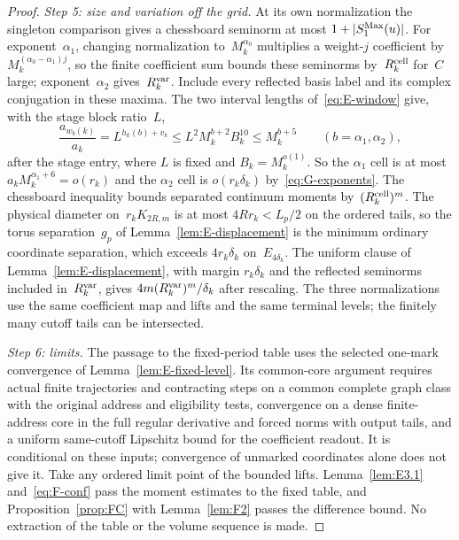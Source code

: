 \begin{proof}
\emph{Step 5: size and variation off the grid.} At its own normalization the singleton comparison gives a chessboard seminorm at most $1+|S_1^{\rm Max}(u)|$. For exponent~$\alpha_1$, changing normalization to~$M_k^{\alpha_0}$ multiplies a weight-$j$ coefficient by $M_k^{(\alpha_0-\alpha_1)j}$, so the finite coefficient sum bounds these seminorms by~$R^{\rm cell}_k$ for~$C$ large; exponent~$\alpha_2$ gives~$R^{\rm var}_k$. Include every reflected basis label and its complex conjugation in these maxima. The two interval lengths of~\eqref{eq:E-window} give, with the stage block ratio~$L$,
\begin{equation}\label{eq:G-root-sides}
\frac{a_{w_b(k)}}{a_k}=L^{h_k(b)+v_k}
\le L^2M_k^{b+2}B_k^{10}\le M_k^{b+5}
\qquad(b=\alpha_1,\alpha_2),
\end{equation}
after the stage entry, where $L$ is fixed and $B_k=M_k^{o(1)}$. So the $\alpha_1$ cell is at most $a_kM_k^{\alpha_1+6}=o(r_k)$ and the $\alpha_2$ cell is $o(r_k\delta_k)$ by~\eqref{eq:G-exponents}. The chessboard inequality bounds separated continuum moments by~$(R^{\rm cell}_k)^m$. The physical diameter on~$r_kK_{2R,m}$ is at most $4Rr_k<L_p/2$ on the ordered tails, so the torus separation~$g_p$ of Lemma~\ref{lem:E-displacement} is the minimum ordinary coordinate separation, which exceeds $4r_k\delta_k$ on~$E_{4\delta_k}$. The uniform clause of Lemma~\ref{lem:E-displacement}, with margin $r_k\delta_k$ and the reflected seminorms included in~$R^{\rm var}_k$, gives $4m(R^{\rm var}_k)^m/\delta_k$ after rescaling. The three normalizations use the same coefficient map and lifts and the same terminal levels; the finitely many cutoff tails can be intersected.

\emph{Step 6: limits.} The passage to the fixed-period table uses the selected one-mark convergence of Lemma~\ref{lem:E-fixed-level}. Its common-core argument requires actual finite trajectories and contracting steps on a common complete graph class with the original address and eligibility tests, convergence on a dense finite-address core in the full regular derivative and forced norms with output tails, and a uniform same-cutoff Lipschitz bound for the coefficient readout. It is conditional on these inputs; convergence of unmarked coordinates alone does not give it. Take any ordered limit point of the bounded lifts. Lemma~\ref{lem:E3.1} and~\eqref{eq:F-conf} pass the moment estimates to the fixed table, and Proposition~\ref{prop:FC} with Lemma~\ref{lem:F2} passes the difference bound. No extraction of the table or the volume sequence is made.
\end{proof}

